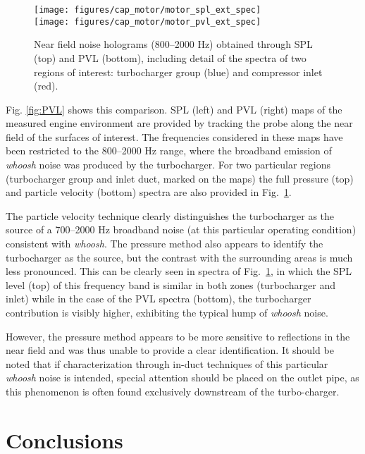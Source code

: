 \begin{figure}[tb!]
\centering
\texttt{[image: figures/cap\_motor/motor\_spl\_ext\_spec]}\\[5mm]
\texttt{[image: figures/cap\_motor/motor\_pvl\_ext\_spec]}
\caption{Near field noise holograms (800--2000 Hz) obtained through SPL (top) and PVL (bottom), including detail of the spectra of two regions of interest: turbocharger group (blue) and compressor inlet (red).}
\label{fig:PVL_spec_ext}
\end{figure}

Fig. \ref{fig:PVL} shows this comparison. SPL (left) and PVL (right) maps of the measured engine environment are provided by tracking the probe along the near field of the surfaces of interest. The frequencies considered in these maps have been restricted to the 800--2000 Hz range, where the broadband emission of \emph{whoosh} noise was produced by the turbocharger. For two particular regions (turbocharger group and inlet duct, marked on the maps) the full pressure (top) and particle velocity (bottom) spectra are also provided in Fig.~\ref{fig:PVL_spec_ext}.

The particle velocity technique clearly distinguishes the turbocharger as the source of a 700--2000 Hz broadband noise (at this particular operating condition) consistent with \emph{whoosh}. The pressure method also appears to identify the turbocharger as the source, but the contrast with the surrounding areas is much less pronounced. This can be clearly seen in spectra of Fig.~\ref{fig:PVL_spec_ext}, in which the SPL level (top) of this frequency band is similar in both zones (turbocharger and inlet) while in the case of the PVL spectra (bottom), the turbocharger contribution is visibly higher, exhibiting the typical hump of \emph{whoosh} noise.

However, the pressure method appears to be more sensitive to reflections in the near field and was thus unable to provide a clear identification. It should be noted that if characterization through in-duct techniques of this particular \emph{whoosh} noise is intended, special attention should be placed on the outlet pipe, as this phenomenon is often found exclusively downstream of the turbo-charger.

\section{Conclusions}
\label{sec:motor_conclusions}

